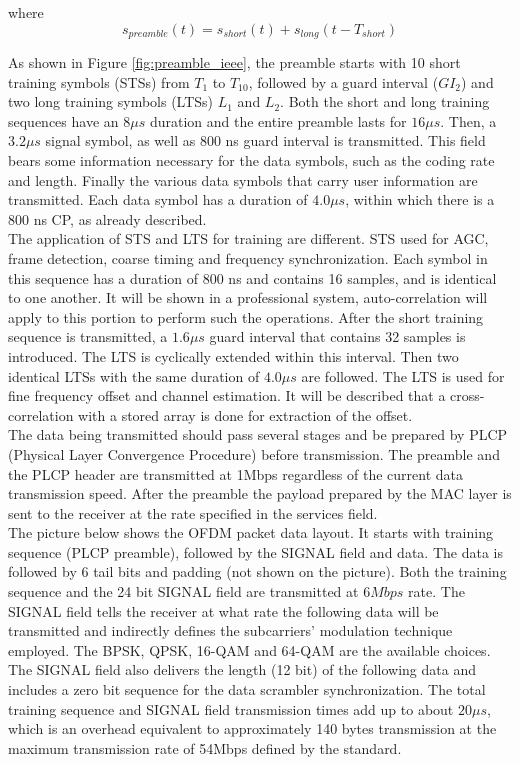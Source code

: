 where\\
\begin{equation} \label{preamble_ofdm}
s_{preamble}(t)= s_{short}(t)+ s_{long}(t- T_{short})
\end{equation}

As shown in Figure \ref{fig:preamble_ieee}, the preamble starts with 10 short training symbols (STSs) from $T_{1}$ to $T_{10}$, followed by a guard interval ($GI_{2}$) and two long training symbols (LTSs) $L_{1}$ and $L_{2}$. Both the short and long training sequences have an $8 \mu s$ duration and the entire preamble lasts for $16 \mu s$. Then, a $3.2 \mu s$ signal symbol, as well as 800 ns guard interval is transmitted. This field bears some information necessary for the data symbols, such as the coding rate and length. Finally the various data symbols that carry user information are transmitted. Each data symbol has a duration of $4.0 \mu s$, within which there is a 800 ns CP, as already described.\\
The application of STS and LTS for training are different. STS used for AGC, frame detection, coarse timing and frequency synchronization. Each symbol in this sequence has a duration of 800 ns and contains 16 samples, and is identical to one another.
 It will be shown in a professional system, auto-correlation will apply to this portion to perform such the operations. After the short training sequence is transmitted, a $1.6 \mu s$ guard interval that contains 32 samples is introduced. The LTS is cyclically extended within this interval. Then two identical LTSs with the same duration of $4.0 \mu s$ are followed. The LTS is used for fine frequency offset and channel estimation. It will be described that a cross-correlation with a stored array is done for extraction of the offset.\\
The data being transmitted should pass several stages and be prepared by PLCP (Physical Layer Convergence Procedure) before transmission. The preamble and the PLCP header are transmitted at 1Mbps regardless of the current data transmission speed. After the preamble the payload prepared by the MAC layer is sent to the receiver at the rate specified in the services field.\\
The picture below shows the OFDM packet data layout. It starts with training sequence (PLCP preamble), followed by the SIGNAL field and data. The data is followed by 6 tail bits and padding (not shown on the picture). Both the training sequence and the 24 bit SIGNAL field are transmitted at $6 Mbps$ rate. The SIGNAL field tells the receiver at what rate the following data will be transmitted and indirectly defines the subcarriers' modulation technique employed. The BPSK, QPSK, 16-QAM and 64-QAM are the available choices. The SIGNAL field also delivers the length (12 bit) of the following data and includes a zero bit sequence for the data scrambler synchronization. The total training sequence and SIGNAL field transmission times add up to about $20 \mu s$, which is an overhead equivalent to approximately 140 bytes transmission at the maximum transmission rate of 54Mbps defined by the standard.\\

